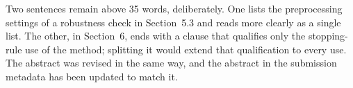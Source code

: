 \documentclass[11pt]{article}
\begin{document}
Two sentences remain above 35 words, deliberately. One lists the preprocessing
settings of a robustness check in Section~5.3 and reads more clearly as a single
list. The other, in Section~6, ends with a clause that qualifies only the
stopping-rule use of the method; splitting it would extend that qualification to
every use.
The abstract was revised in the same
way, and the abstract in the submission metadata has been updated to match it.
\end{document}
